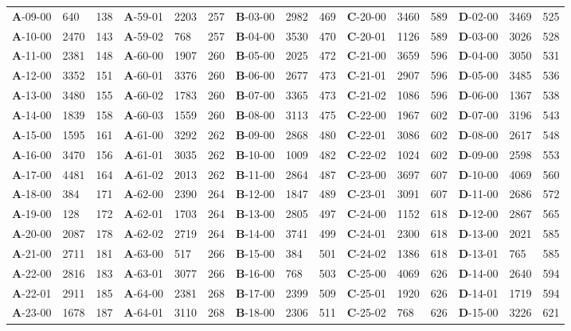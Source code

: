 \begin{table*}
\begin{tabular}{lllllllllllllll}
\textbf{A}-09-00&640&138&\textbf{A}-59-01&2203&257&\textbf{B}-03-00&2982&469&\textbf{C}-20-00&3460&589&\textbf{D}-02-00&3469&525\\
\textbf{A}-10-00&2470&143&\textbf{A}-59-02&768&257&\textbf{B}-04-00&3530&470&\textbf{C}-20-01&1126&589&\textbf{D}-03-00&3026&528\\
\textbf{A}-11-00&2381&148&\textbf{A}-60-00&1907&260&\textbf{B}-05-00&2025&472&\textbf{C}-21-00&3659&596&\textbf{D}-04-00&3050&531\\
\textbf{A}-12-00&3352&151&\textbf{A}-60-01&3376&260&\textbf{B}-06-00&2677&473&\textbf{C}-21-01&2907&596&\textbf{D}-05-00&3485&536\\
\textbf{A}-13-00&3480&155&\textbf{A}-60-02&1783&260&\textbf{B}-07-00&3365&473&\textbf{C}-21-02&1086&596&\textbf{D}-06-00&1367&538\\
\textbf{A}-14-00&1839&158&\textbf{A}-60-03&1559&260&\textbf{B}-08-00&3113&475&\textbf{C}-22-00&1967&602&\textbf{D}-07-00&3196&543\\
\textbf{A}-15-00&1595&161&\textbf{A}-61-00&3292&262&\textbf{B}-09-00&2868&480&\textbf{C}-22-01&3086&602&\textbf{D}-08-00&2617&548\\
\textbf{A}-16-00&3470&156&\textbf{A}-61-01&3035&262&\textbf{B}-10-00&1009&482&\textbf{C}-22-02&1024&602&\textbf{D}-09-00&2598&553\\
\textbf{A}-17-00&4481&164&\textbf{A}-61-02&2013&262&\textbf{B}-11-00&2864&487&\textbf{C}-23-00&3697&607&\textbf{D}-10-00&4069&560\\
\textbf{A}-18-00&384&171&\textbf{A}-62-00&2390&264&\textbf{B}-12-00&1847&489&\textbf{C}-23-01&3091&607&\textbf{D}-11-00&2686&572\\
\textbf{A}-19-00&128&172&\textbf{A}-62-01&1703&264&\textbf{B}-13-00&2805&497&\textbf{C}-24-00&1152&618&\textbf{D}-12-00&2867&565\\
\textbf{A}-20-00&2087&178&\textbf{A}-62-02&2719&264&\textbf{B}-14-00&3741&499&\textbf{C}-24-01&2300&618&\textbf{D}-13-00&2021&585\\
\textbf{A}-21-00&2711&181&\textbf{A}-63-00&517&266&\textbf{B}-15-00&384&501&\textbf{C}-24-02&1386&618&\textbf{D}-13-01&765&585\\
\textbf{A}-22-00&2816&183&\textbf{A}-63-01&3077&266&\textbf{B}-16-00&768&503&\textbf{C}-25-00&4069&626&\textbf{D}-14-00&2640&594\\
\textbf{A}-22-01&2911&185&\textbf{A}-64-00&2381&268&\textbf{B}-17-00&2399&509&\textbf{C}-25-01&1920&626&\textbf{D}-14-01&1719&594\\
\textbf{A}-23-00&1678&187&\textbf{A}-64-01&3110&268&\textbf{B}-18-00&2306&511&\textbf{C}-25-02&768&626&\textbf{D}-15-00&3226&621\\

\end{tabular}
\end{table*}
